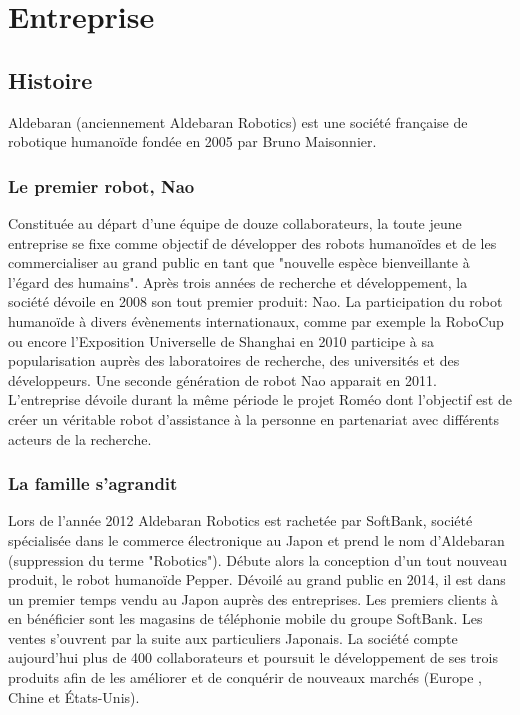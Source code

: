 \chapter{Entreprise}
\label{Entreprise}
\thispagestyle{fancy}

\section{Histoire}
\label{Entreprise: histoire}
Aldebaran (anciennement Aldebaran Robotics) est une société française de robotique humanoïde fondée en 2005 par Bruno Maisonnier. 

\subsection{Le premier robot, Nao}
\label{Entreprise:Histoire:Nao}
Constituée au départ d'une équipe de douze collaborateurs, la toute jeune entreprise se fixe comme objectif de développer des robots humanoïdes et de les commercialiser au grand public en tant que "nouvelle espèce bienveillante à l'égard des humains". Après trois années de recherche et développement, la société dévoile en 2008 son tout premier produit: Nao. La participation du robot humanoïde à divers évènements internationaux, comme par exemple la RoboCup ou encore l'Exposition Universelle de Shanghai en 2010 participe à sa popularisation auprès des laboratoires de recherche, des universités et des développeurs. Une seconde génération de robot Nao apparait en 2011. L'entreprise dévoile durant la même période le projet Roméo dont l'objectif est de créer un véritable robot d'assistance à la personne en partenariat avec différents acteurs de la recherche. 

\subsection{La famille s'agrandit}
\label{Entreprise: La famille Aldebaran}
Lors de l'année 2012 Aldebaran Robotics est rachetée par SoftBank, société spécialisée dans le commerce électronique au Japon et prend le nom d'Aldebaran (suppression du terme "Robotics"). Débute alors la conception d'un tout nouveau produit, le robot humanoïde Pepper. Dévoilé au grand public en 2014, il est dans un premier temps vendu au Japon auprès des entreprises. Les premiers clients à en bénéficier sont les magasins de téléphonie mobile du groupe SoftBank. Les ventes s'ouvrent par la suite aux particuliers Japonais. La société compte aujourd'hui plus de 400 collaborateurs et poursuit le développement de ses trois produits afin de les améliorer et de conquérir de nouveaux marchés (Europe , Chine et États-Unis).

